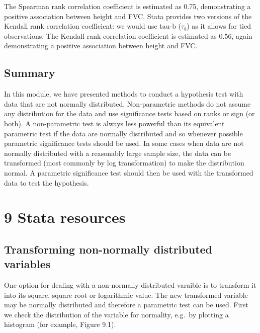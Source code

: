 \documentclass[
]{memoir}
\begin{document}
The Spearman rank correlation coefficient is estimated as 0.75, demonstrating a positive association between height and FVC.
Stata provides two versions of the Kendall rank correlation coefficient: we would use tau-b (\(\tau_b\)) as it allows for tied observations. The Kendall rank correlation coefficient is estimated as 0.56, again demonstrating a positive association between height and FVC.

\hypertarget{summary-1}{%
\section{Summary}\label{summary-1}}

In this module, we have presented methods to conduct a hypothesis test with data that are not normally distributed. Non-parametric methods do not assume any distribution for the data and use significance tests based on ranks or sign (or both). A non-parametric test is always less powerful than its equivalent parametric test if the data are normally distributed and so whenever possible parametric significance tests should be used. In some cases when data are not normally distributed with a reasonably large sample size, the data can be transformed (most commonly by log transformation) to make the distribution normal. A parametric significance test should then be used with the transformed data to test the hypothesis.

\hypertarget{stata-resources-1}{%
\chapter*{\texorpdfstring{\textbf{9} Stata resources}{9 Stata resources}}\label{stata-resources-1}}

\hypertarget{transforming-non-normally-distributed-variables-1}{%
\section{Transforming non-normally distributed variables}\label{transforming-non-normally-distributed-variables-1}}

One option for dealing with a non-normally distributed varaible is to transform it into its square, square root or logarithmic value. The new transformed variable may be normally distributed and therefore a parametric test can be used. First we check the distribution of the variable for normality, e.g.~by plotting a histogram (for example, Figure 9.1).
\end{document}
